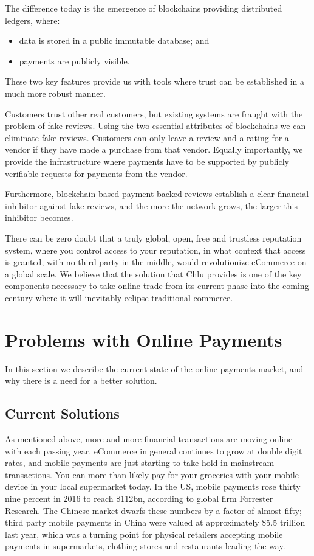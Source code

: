 \documentclass[a4paper]{article}
\begin{document}
The difference today is the emergence of blockchains providing
distributed ledgers, where:

\begin{itemize}
  \item data is stored in a public immutable database; and
  \item payments are publicly visible. 
\end{itemize}

These two key features provide us with tools where trust can be
established in a much more robust manner.

Customers trust other real customers, but existing systems are fraught
with the problem of fake reviews. Using the two essential attributes
of blockchains we can eliminate fake reviews. Customers can only leave
a review and a rating for a vendor if they have made a purchase from
that vendor. Equally importantly, we provide the infrastructure where
payments have to be supported by publicly verifiable requests for
payments from the vendor.

Furthermore, blockchain based payment backed reviews establish a clear
financial inhibitor against fake reviews, and the more the network
grows, the larger this inhibitor becomes.

There can be zero doubt that a truly global, open, free and trustless
reputation system, where you control access to your reputation, in
what context that access is granted, with no third party in the
middle, would revolutionize eCommerce on a global scale. We believe
that the solution that Chlu provides is one of the key components
necessary to take online trade from its current phase into the coming
century where it will inevitably eclipse traditional commerce.

\section{Problems with Online Payments}

In this section we describe the current state of the online payments
market, and why there is a need for a better solution.

\subsection{Current Solutions}

As mentioned above, more and more financial transactions are moving
online with each passing year. eCommerce in general continues to grow
at double digit rates, and mobile payments are just starting to take
hold in mainstream transactions. You can more than likely pay for your
groceries with your mobile device in your local supermarket today. In
the US, mobile payments rose thirty nine percent in 2016 to reach
\$112bn, according to global firm Forrester Research. The Chinese
market dwarfs these numbers by a factor of almost fifty; third party
mobile payments in China were valued at approximately \$5.5 trillion
last year, which was a turning point for physical retailers accepting
mobile payments in supermarkets, clothing stores and restaurants
leading the way.
\end{document}
